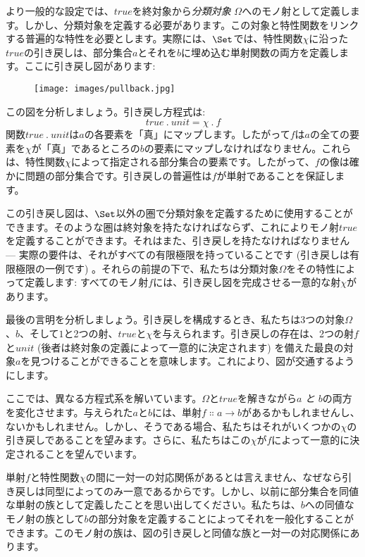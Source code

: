 より一般的な設定では、\(\mathit{true}\)を終対象から\emph{分類対象} \(\Omega\)へのモノ射として定義します。しかし、分類対象を定義する必要があります。この対象と特性関数をリンクする普遍的な特性を必要とします。実際には、\(\Set\)では、特性関数\(\chi\)に沿った\(\mathit{true}\)の引き戻しは、部分集合\(a\)とそれを\(b\)に埋め込む単射関数の両方を定義します。ここに引き戻し図があります: 

\begin{figure}[H]
  \centering
  \texttt{[image: images/pullback.jpg]}
\end{figure}

\noindent
この図を分析しましょう。引き戻し方程式は: 
\[\mathit{true}\ .\ \mathit{unit} = \chi\ .\ f\]
関数\(\mathit{true}\ .\ \mathit{unit}\)は\(a\)の各要素を「真」にマップします。したがって\(f\)は\(a\)の全ての要素を\(\chi\)が「真」であるところの\(b\)の要素にマップしなければなりません。これらは、特性関数\(\chi\)によって指定される部分集合の要素です。したがって、\(f\)の像は確かに問題の部分集合です。引き戻しの普遍性は\(f\)が単射であることを保証します。

この引き戻し図は、\(\Set\)以外の圏で分類対象を定義するために使用することができます。そのような圏は終対象を持たなければならず、これによりモノ射\(\mathit{true}\)を定義することができます。それはまた、引き戻しを持たなければなりません --- 実際の要件は、それがすべての有限極限を持っていることです (引き戻しは有限極限の一例です) 。それらの前提の下で、私たちは分類対象\(\Omega\)をその特性によって定義します: すべてのモノ射\(f\)には、引き戻し図を完成させる一意的な射\(\chi\)があります。

最後の言明を分析しましょう。引き戻しを構成するとき、私たちは3つの対象\(\Omega\)、\(b\)、そして\(1\)と2つの射、\(\mathit{true}\)と\(\chi\)を与えられます。引き戻しの存在は、2つの射\(f\)と\(\mathit{unit}\) (後者は終対象の定義によって一意的に決定されます) を備えた最良の対象\(a\)を見つけることができることを意味します。これにより、図が交通するようにします。

ここでは、異なる方程式系を解いています。\(\Omega\)と\(\mathit{true}\)を解きながら\(a\) \emph{と} \(b\)の両方を変化させます。与えられた\(a\)と\(b\)には、単射\(f \Colon a \to b\)があるかもしれませんし、ないかもしれません。しかし、そうである場合、私たちはそれがいくつかの\(\chi\)の引き戻しであることを望みます。さらに、私たちはこの\(\chi\)が\(f\)によって一意的に決定されることを望んでいます。

単射\(f\)と特性関数\(\chi\)の間に一対一の対応関係があるとは言えません、なぜなら引き戻しは同型によってのみ一意であるからです。しかし、以前に部分集合を同値な単射の族として定義したことを思い出してください。私たちは、\(b\)への同値なモノ射の族として\(b\)の部分対象を定義することによってそれを一般化することができます。このモノ射の族は、図の引き戻しと同値な族と一対一の対応関係にあります。

